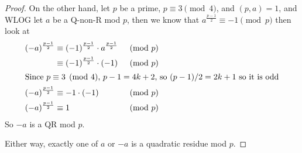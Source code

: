 \documentclass[11pt]{article}
\begin{document}
\begin{itemize}
\begin{itemize}
\begin{proof}
                  On the other hand, let $p$ be a prime, $p\equiv 3\pmod{4}$, and $(p,a)=1$, and WLOG let $a$ be a Q-non-R mod $p$, then we know that $a^{\frac{p-1}{2}} \equiv -1 \pmod{p}$
                  then look at
                  \begin{align*}
                    (-a)^{\frac{p-1}{2}} & \equiv (-1)^{\frac{p-1}{2}} \cdot a^{\frac{p-1}{2}} & \pmod{p} \\
                                         & \equiv (-1)^{\frac{p-1}{2}} \cdot (-1)              & \pmod{p} \\
                    \intertext{Since $p\equiv 3\pmod{4}$, $p-1=4k+2$, so $(p-1)/2=2k+1$ so it is odd}
                    (-a)^{\frac{p-1}{2}} & \equiv -1  \cdot (-1)                               & \pmod{p} \\
                    (-a)^{\frac{p-1}{2}} & \equiv 1                                            & \pmod{p} \\
                  \end{align*}
                  So $-a$ is a QR mod $p$.

                  Either way, exactly one of $a$ or $-a$ is a quadratic residue mod $p$.
                \end{proof}
        \end{itemize}
\end{itemize}
\end{document}
